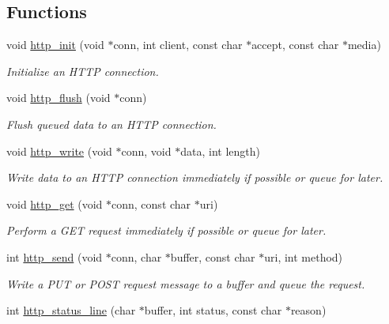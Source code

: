 \subsection*{Functions}
\begin{DoxyCompactItemize}
\item 
void \hyperlink{group__http__connection_gaf3fe661f3848c3ce13c987c4f3f72ffb}{http\+\_\+init} (void $\ast$conn, int client, const char $\ast$accept, const char $\ast$media)
\begin{DoxyCompactList}\small\item\em Initialize an H\+T\+TP connection. \end{DoxyCompactList}\item 
void \hyperlink{group__http__connection_ga219c5661faaf31ba853fc7a4f4aaac07}{http\+\_\+flush} (void $\ast$conn)
\begin{DoxyCompactList}\small\item\em Flush queued data to an H\+T\+TP connection. \end{DoxyCompactList}\item 
void \hyperlink{group__http__connection_gad284834e20a26101fcd6e6751922c92e}{http\+\_\+write} (void $\ast$conn, void $\ast$data, int length)
\begin{DoxyCompactList}\small\item\em Write data to an H\+T\+TP connection immediately if possible or queue for later. \end{DoxyCompactList}\item 
void \hyperlink{group__http__connection_ga6d911522875a4b99a4172e4a02b78a8a}{http\+\_\+get} (void $\ast$conn, const char $\ast$uri)
\begin{DoxyCompactList}\small\item\em Perform a G\+ET request immediately if possible or queue for later. \end{DoxyCompactList}\item 
int \hyperlink{group__http__connection_ga9d3a703c0cf3b053e915eaec5b394c28}{http\+\_\+send} (void $\ast$conn, char $\ast$buffer, const char $\ast$uri, int method)
\begin{DoxyCompactList}\small\item\em Write a P\+UT or P\+O\+ST request message to a buffer and queue the request. \end{DoxyCompactList}\item 
int \hyperlink{group__http__connection_ga81ef4c524a625b75de614b745300fd45}{http\+\_\+status\+\_\+line} (char $\ast$buffer, int status, const char $\ast$reason)

\end{DoxyCompactItemize}
